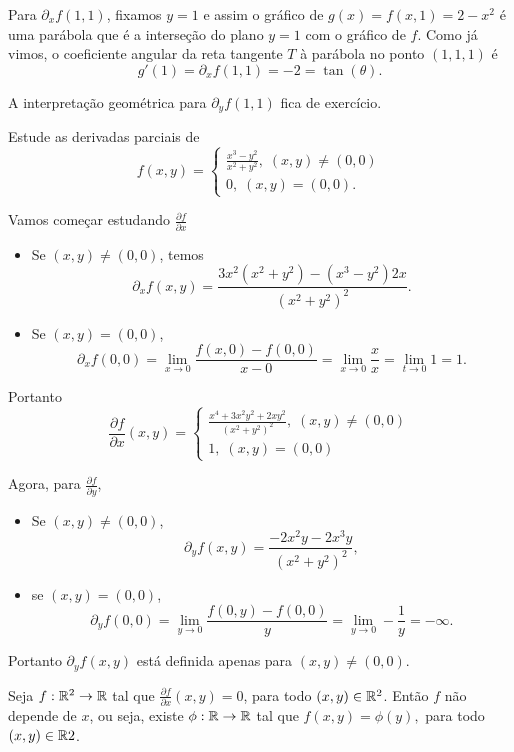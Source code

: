\begin{example}
    Para \(\partial_xf(1,1)\), fixamos \(y=1\) e assim o gráfico de \(g(x) = f(x,1) = 2 - x^2\) é uma parábola que é a interseção do plano \(y=1\) com o gráfico de \(f\). Como já vimos, o coeficiente angular da reta tangente \(T\) à parábola no ponto \((1,1,1)\) é \[g'(1) = \partial_xf(1,1) = -2 = \tan(\theta).\] 
    
    A interpretação geométrica para \(\partial_yf(1,1)\) fica de exercício.    
\end{example}

\begin{example}
    Estude as derivadas parciais de \[f(x,y) = \begin{cases}
        \frac{x^3 - y^2}{x^2 + y^2},\; (x,y)\neq(0,0) \\
        0,\; (x,y)=(0,0).
    \end{cases}\] 

    Vamos começar estudando \(\frac{\partial f}{\partial x}\)
        \begin{itemize}
            \item Se \((x,y) \neq (0,0)\), temos \[\partial_xf(x,y) = \frac{3x^2(x^2+y^2) - (x^3-y^2)2x}{(x^2+y^2)^2}.\]
            \item Se \((x,y)=(0,0)\), \[\partial_xf(0,0) = \lim_{x\to 0} \frac{f(x,0)-f(0,0)}{x-0} = \lim_{x\to 0} \frac{x}{x} = \lim_{t\to 0} 1 = 1.\]
        \end{itemize}
    Portanto \[\frac{\partial f}{\partial x}(x,y) = \begin{cases}
        \frac{x^4 + 3x^2y^2 + 2xy^2}{(x^2+y^2)^2},\; (x,y)\neq(0,0) \\
        1,\; (x,y)=(0,0)
    \end{cases}\]

    Agora, para \(\frac{\partial f}{\partial y}\),
    \begin{itemize}
        \item Se \((x,y)\neq(0,0)\), \[\partial_y f(x,y) 
        = \frac{-2x^2y - 2x^3y}{(x^2+y^2)^2},\]
        \item se \((x,y)=(0,0)\), \[\partial_yf(0,0) = \lim_{y\to 0} \frac{f(0,y)-f(0,0)}{y} = \lim_{y\to 0} -\frac{1}{y} = -\infty.\]
    \end{itemize}
    Portanto \(\partial_y f(x,y)\) está definida apenas para \((x,y)\neq(0,0)\).
\end{example}

\begin{proposition}
    Seja \(f:\mathbb{R}^2\to\mathbb{R}\) tal que \(\frac{\partial f}{\partial x}(x,y) = 0\), para todo \((x,y)\in\mathbb{R}^2\). Então \(f\) não depende de \(x\), ou seja, existe \(\phi:\mathbb{R}\to\mathbb{R}\) tal que \(f(x,y) = \phi(y),\) para todo \((x,y)\in\mathbb{R} 2\).
\end{proposition}

